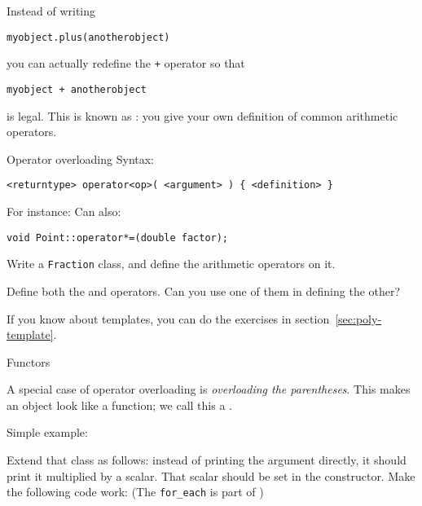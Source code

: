 Instead of writing 
\begin{lstlisting}
myobject.plus(anotherobject)
\end{lstlisting}
you can actually redefine the \lstinline{+} operator so that
\begin{lstlisting}
myobject + anotherobject
\end{lstlisting}
is legal. This is known as :
you give your own definition of common arithmetic operators.

\begin{block}{Operator overloading}
  \label{sl:object-operator}
  Syntax:
\begin{lstlisting}
<returntype> operator<op>( <argument> ) { <definition> }
\end{lstlisting}
For instance:
%
%
Can also:
\begin{lstlisting}
void Point::operator*=(double factor);
\end{lstlisting}
\end{block}

\begin{exercise}
  Write a \lstinline{Fraction} class, and define the arithmetic operators on it.

  Define both the \n{+} and \n{+=} operators. Can you use one of them
  in defining the other?
\end{exercise}
\begin{exercise}
  If you know about templates, you can do the exercises in section~\ref{sec:poly-template}.
\end{exercise}

 {Functors}
\label{sec:functor}

A special case of operator overloading is
%
\emph{overloading the parentheses}. This makes an object look like a
function; we call this a .

Simple example:
%

\begin{exercise}
  \label{ex:functor2}
  Extend that class as follows: instead of printing the argument
  directly, it should print it multiplied by a scalar. That scalar
  should be set in the constructor. Make the following code work:
  (The \lstinline{for_each} is part of )
\end{exercise}


